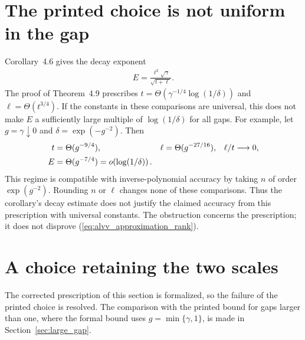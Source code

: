\documentclass{article}
\begin{document}
\section{The printed choice is not uniform in the gap}

Corollary~4.6 gives the decay exponent
\begin{align}
    E=\frac{\ell^2\sqrt\gamma}{\sqrt{t+\ell}}.
    \label{eq:alvv_approximation_exponent}
\end{align}
The proof of Theorem~4.9 prescribes
$t=\Theta(\gamma^{-1/4}\log(1/\delta))$ and
$\ell=\Theta(t^{3/4})$.
If the constants in these comparisons are universal, this does not make
$E$ a sufficiently large multiple of $\log(1/\delta)$ for all gaps.
For example, let $g=\gamma\downarrow0$ and
$\delta=\exp(-g^{-2})$. Then
\begin{align}
    t      & =\Theta(g^{-9/4}),                                &
    \ell   & =\Theta(g^{-27/16}),                              &
    \ell/t & \longrightarrow0,\notag                             \\
    E      & =\Theta(g^{-7/4})=o\!\left(\log(1/\delta)\right).
    \label{eq:alvv_approximation_prescription}
\end{align}
This regime is compatible with inverse-polynomial accuracy by taking
$n$ of order $\exp(g^{-2})$. Rounding $n$ or $\ell$ changes none of these
comparisons. Thus the corollary's decay estimate does not justify the
claimed accuracy from this prescription with universal constants.
The obstruction concerns the prescription; it does not disprove
(\ref{eq:alvv_approximation_rank}).

\section{A choice retaining the two scales}

The corrected prescription of this section is formalized, so the failure of
the printed choice is resolved. The comparison with the printed bound for
gaps larger than one, where the formal bound uses $g=\min\{\gamma,1\}$, is
made in Section~\ref{sec:large_gap}.
\end{document}
